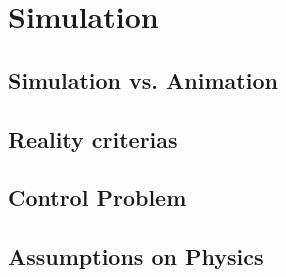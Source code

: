 
\chapter{Simulation}
\label{chap:simulation}

\section{Simulation vs. Animation}
\label{sec:simulation_animation}

\section{Reality criterias}
\label{sec:reality}

\section{Control Problem}
\label{sec:control_problem}

\section{Assumptions on Physics}
\label{sec:physics}